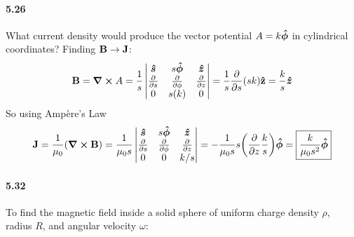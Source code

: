 \documentclass[../main.tex]{subfiles}
\begin{document}
\newpage
\paragraph{5.26} What current density would produce the vector potential $A = k \vu*\phi$ in cylindrical coordinates?
Finding $\vb B \to \vb J$: 
\begin{align*}
    \vb B = \curl A =  \frac{1}{s}\begin{vmatrix}
         \vu*s & s \vu*\phi & \vu*z \\
        \pdv{s} & \pdv{\phi} & \pdv{z} \\
        0 & s(k) & 0
    \end{vmatrix}
    = \frac{1}{s} \pdv{s}(sk) \vu z = \frac{k}{s} \vu*z
\end{align*}
So using Amp\`ere's Law
\begin{align*}
    \vb J = \frac{1}{\mu_0} (\curl \vb B) = \frac{1}{\mu_0 s} \begin{vmatrix}
        \vu*s & s \vu*\phi & \vu*z \\
        \pdv{s} & \pdv{\phi} & \pdv{z} \\
        0 & 0 & k/s
    \end{vmatrix}
    = -\frac{1}{\mu_0 s} s \qt(\pdv{z} \frac{k}{s}) \vu*\phi = \boxed{ \frac{k}{\mu_0 s^2} \vu*\phi }
\end{align*}

\newpage
\paragraph{5.32} To find the magnetic field inside a solid sphere of
uniform charge density $\rho$, radius $R$, and angular velocity $\omega$:
\end{document}
